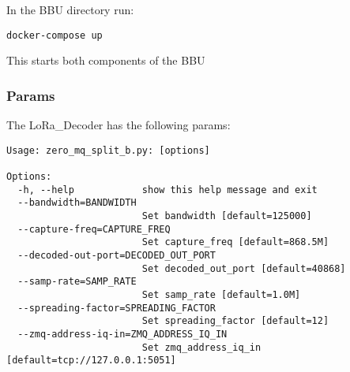 In the BBU directory run:

\begin{verbatim}
docker-compose up 
\end{verbatim}

This starts both components of the BBU

\subsubsection{Params}\label{params}

The LoRa\_Decoder has the following params:

\begin{verbatim}
Usage: zero_mq_split_b.py: [options]

Options:
  -h, --help            show this help message and exit
  --bandwidth=BANDWIDTH
                        Set bandwidth [default=125000]
  --capture-freq=CAPTURE_FREQ
                        Set capture_freq [default=868.5M]
  --decoded-out-port=DECODED_OUT_PORT
                        Set decoded_out_port [default=40868]
  --samp-rate=SAMP_RATE
                        Set samp_rate [default=1.0M]
  --spreading-factor=SPREADING_FACTOR
                        Set spreading_factor [default=12]
  --zmq-address-iq-in=ZMQ_ADDRESS_IQ_IN
                        Set zmq_address_iq_in [default=tcp://127.0.0.1:5051]
\end{verbatim}

